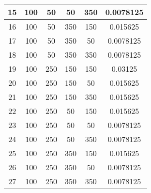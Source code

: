 \documentclass{article}
\begin{document}
\begin{table}[ht]
\begin{tabular}{|c|c c c c|c|}
                15 & 100 & 50 & 50 & 350 & 0.0078125\\\hline
                16 & 100 & 50 & 350 & 150 & 0.015625\\\hline
                17 & 100 & 50 & 350 & 50 & 0.0078125\\\hline
                18 & 100 & 50 & 350 & 350 & 0.0078125\\\hline
                19 & 100 & 250 & 150 & 150 & 0.03125\\\hline
                20 & 100 & 250 & 150 & 50 & 0.015625\\\hline
                21 & 100 & 250 & 150 & 350 & 0.015625\\\hline
                22 & 100 & 250 & 50 & 150 & 0.015625\\\hline
                23 & 100 & 250 & 50 & 50 & 0.0078125\\\hline
                24 & 100 & 250 & 50 & 350 & 0.0078125\\\hline
                25 & 100 & 250 & 350 & 150 & 0.015625\\\hline
                26 & 100 & 250 & 350 & 50 & 0.0078125\\\hline
                27 & 100 & 250 & 350 & 350 & 0.0078125\\\hline
        \end{tabular}
\end{table}
\pagebreak
\end{document}
